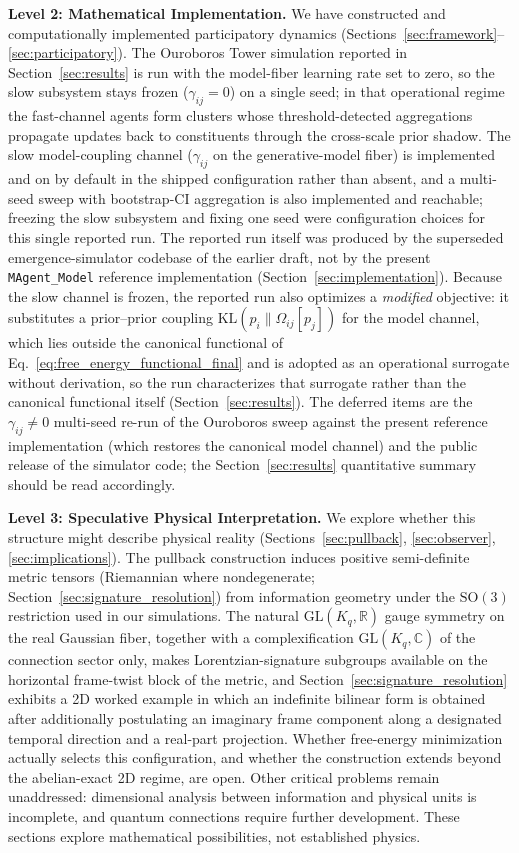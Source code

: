 \documentclass[11pt]{article}
\begin{document}
\textbf{Level 2: Mathematical Implementation.} We have constructed and computationally implemented participatory dynamics (Sections~\ref{sec:framework}--\ref{sec:participatory}). The Ouroboros Tower simulation reported in Section~\ref{sec:results} is run with the model-fiber learning rate set to zero, so the slow subsystem stays frozen ($\gamma_{ij} = 0$) on a single seed; in that operational regime the fast-channel agents form clusters whose threshold-detected aggregations propagate updates back to constituents through the cross-scale prior shadow. The slow model-coupling channel ($\gamma_{ij}$ on the generative-model fiber) is implemented and on by default in the shipped configuration rather than absent, and a multi-seed sweep with bootstrap-CI aggregation is also implemented and reachable; freezing the slow subsystem and fixing one seed were configuration choices for this single reported run. The reported run itself was produced by the superseded emergence-simulator codebase of the earlier draft, not by the present \texttt{MAgent\_Model} reference implementation (Section~\ref{sec:implementation}). Because the slow channel is frozen, the reported run also optimizes a \emph{modified} objective: it substitutes a prior--prior coupling $\mathrm{KL}(p_i \| \Omega_{ij}[p_j])$ for the model channel, which lies outside the canonical functional of Eq.~\eqref{eq:free_energy_functional_final} and is adopted as an operational surrogate without derivation, so the run characterizes that surrogate rather than the canonical functional itself (Section~\ref{sec:results}). The deferred items are the $\gamma_{ij} \neq 0$ multi-seed re-run of the Ouroboros sweep against the present reference implementation (which restores the canonical model channel) and the public release of the simulator code; the Section~\ref{sec:results} quantitative summary should be read accordingly.

\textbf{Level 3: Speculative Physical Interpretation.} We explore whether this structure might describe physical reality (Sections~\ref{sec:pullback}, \ref{sec:observer}, \ref{sec:implications}). The pullback construction induces positive semi-definite metric tensors (Riemannian where nondegenerate; Section~\ref{sec:signature_resolution}) from information geometry under the $\mathrm{SO}(3)$ restriction used in our simulations. The natural $\mathrm{GL}(K_q, \mathbb{R})$ gauge symmetry on the real Gaussian fiber, together with a complexification $\mathrm{GL}(K_q, \mathbb{C})$ of the connection sector only, makes Lorentzian-signature subgroups available on the horizontal frame-twist block of the metric, and Section~\ref{sec:signature_resolution} exhibits a 2D worked example in which an indefinite bilinear form is obtained after additionally postulating an imaginary frame component along a designated temporal direction and a real-part projection. Whether free-energy minimization actually selects this configuration, and whether the construction extends beyond the abelian-exact 2D regime, are open. Other critical problems remain unaddressed: dimensional analysis between information and physical units is incomplete, and quantum connections require further development. These sections explore mathematical possibilities, not established physics.
\end{document}

